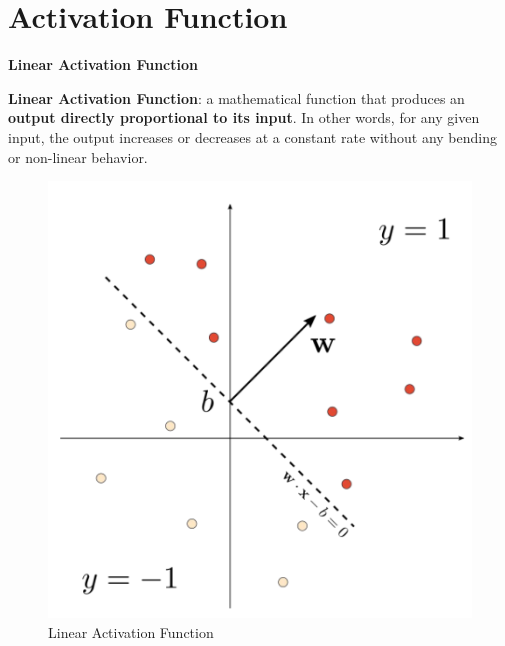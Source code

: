 \section{Activation Function}

\textbf{Linear Activation Function}
\begin{definition}
    \textbf{Linear Activation Function}: a mathematical function that produces an \textbf{output directly proportional to its input}. In other words, for any given input, the output increases or decreases at a constant rate without any bending or non-linear behavior.
\end{definition}
\begin{figure}[h!t]
    \centering
    \includegraphics[width=0.4\linewidth]{linearactivation.png}
    \caption{Linear Activation Function}
    \label{fig:enter-label}
\end{figure}
